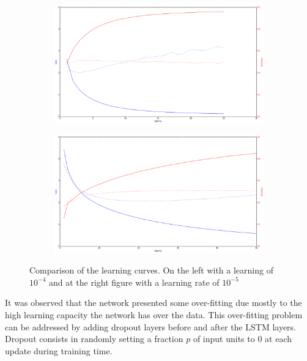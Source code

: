 \begin{figure}[H]
\centering
\begin{subfigure}[b]{.5\textwidth}
  \centering
  \includegraphics[width=1\linewidth]{img/methodology/training_bad}
\end{subfigure}%
\begin{subfigure}[b]{.5\textwidth}
  \centering
  \includegraphics[width=1\linewidth]{img/methodology/training_good}
\end{subfigure}
\caption{Comparison of the learning curves. On the left with a learning of $10^{-4}$ and at the right figure with a learning rate of $10^{-5}$}
\label{fig:training_curves_comparison}
\end{figure}

It was observed that the network presented some over-fitting due mostly to the high learning capacity the network has over the data. %
This over-fitting problem can be addressed by adding dropout\cite{srivastava2014dropout} layers before and after the LSTM layers. Dropout consists in randomly setting a fraction $p$ of input units to 0 at each update during training time. %


